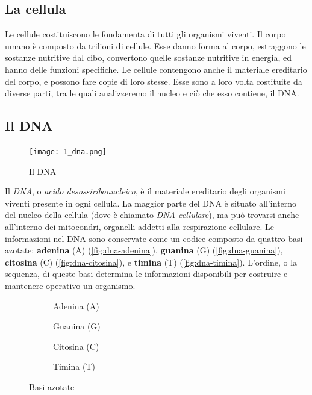 \subsection{La cellula}
\label{chap:intro-biology-cell}

Le cellule costituiscono le fondamenta di tutti gli organismi viventi. Il corpo umano è composto da trilioni di cellule. Esse danno forma al corpo, estraggono le sostanze nutritive dal cibo, convertono quelle sostanze nutritive in energia, ed hanno delle funzioni specifiche. Le cellule contengono anche il materiale ereditario del corpo, e possono fare copie di loro stesse. Esse sono a loro volta costituite da diverse parti, tra le quali analizzeremo il nucleo e ciò che esso contiene, il DNA.

\subsection{Il DNA}
\label{chap:intro-biology-dna}

\begin{figure}
    \centering
    \texttt{[image: 1\_dna.png]}
    \caption{Il DNA}
    \label{fig:dna}
\end{figure}

Il \textit{DNA}, o \textit{acido desossiribonucleico}, è il materiale ereditario degli organismi viventi presente in ogni cellula. La maggior parte del DNA è situato all'interno del nucleo della cellula (dove è chiamato \textit{DNA cellulare}), ma può trovarsi anche all'interno dei mitocondri, organelli addetti alla respirazione cellulare. Le informazioni nel DNA sono conservate come un codice composto da quattro basi azotate: \textbf{adenina} (A) (\autoref{fig:dna-adenina}), \textbf{guanina} (G) (\autoref{fig:dna-guanina}), \textbf{citosina} (C) (\autoref{fig:dna-citosina}), e \textbf{timina} (T) (\autoref{fig:dna-timina}). L'ordine, o la sequenza, di queste basi determina le informazioni disponibili per costruire e mantenere operativo un organismo.

\begin{figure}[!h]
    \begin{subfigure}[b]{0.5 \textwidth}
        \centering
        \adenina
        \caption{Adenina (A)}
        \vspace{4ex}
        \label{fig:dna-adenina}
    \end{subfigure}
    \begin{subfigure}[b]{0.5 \textwidth}
        \centering
        \guanina
        \caption{Guanina (G)}
        \vspace{4ex}
        \label{fig:dna-guanina}
    \end{subfigure}
    \begin{subfigure}[b]{0.5 \textwidth}
        \centering
        \citosina
        \caption{Citosina (C)}
        \label{fig:dna-citosina}
    \end{subfigure}
    \begin{subfigure}[b]{0.5 \textwidth}
        \centering
        \timina
        \caption{Timina (T)}
        \label{fig:dna-timina}
    \end{subfigure}
    \label{fig:dna-basi}
    \caption{Basi azotate}
\end{figure}

